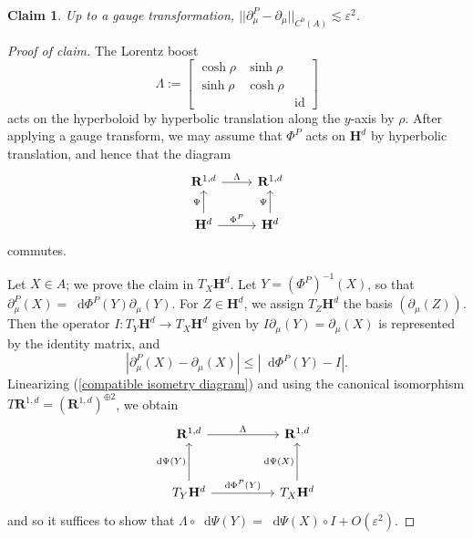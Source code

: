 \documentclass[reqno,10pt]{amsart}
\newcommand{\RR}{\mathbf{R}}
\newcommand{\Hyp}{\mathbf H}
\DeclareMathOperator{\id}{id}
\newcommand*\dif{\mathop{}\!\mathrm{d}}
\newtheorem{claim}{Claim}[theorem]
\theoremstyle{definition}
\numberwithin{equation}{section}
\begin{document}
\begin{claim}
Up to a gauge transformation, $||\partial^P_\mu - \partial_\mu||_{C^0(A)} \lesssim \varepsilon^2$.
\end{claim}
\begin{proof}[Proof of claim]
The Lorentz boost
$$\Lambda := \begin{bmatrix}\cosh \rho & \sinh \rho \\ \sinh \rho & \cosh \rho \\ &&\id\end{bmatrix}$$
acts on the hyperboloid by hyperbolic translation along the $y$-axis by $\rho$.
After applying a gauge transform, we may assume that $\Phi^P$ acts on $\Hyp^d$ by hyperbolic translation, and hence that the diagram
\begin{equation}\label{compatible isometry diagram}
\begin{tikzcd}
\RR^{1, d} \arrow[r, "\Lambda"] & \RR^{1, d} \\
\Hyp^d \arrow[u, "\Psi"] \arrow[r, "\Phi^P"] & \Hyp^d \arrow[u, "\Psi"]
\end{tikzcd}
\end{equation}
commutes. 

Let $X \in A$; we prove the claim in $T_X \Hyp^d$.
Let $Y = (\Phi^P)^{-1}(X)$, so that $\partial^P_\mu(X) = \dif \Phi^P(Y) \partial_\mu(Y)$.
For $Z \in \Hyp^d$, we assign $T_Z \Hyp^d$ the basis $(\partial_\mu(Z))$.
Then the operator $I: T_Y \Hyp^d \to T_X \Hyp^d$ given by $I \partial_\mu(Y) = \partial_\mu(X)$ is represented by the identity matrix, and
$$|\partial^P_\mu(X) - \partial_\mu(X)| \leq |\dif \Phi^P(Y) - I|.$$
Linearizing (\ref{compatible isometry diagram}) and using the canonical isomorphism $T\RR^{1, d} = (\RR^{1, d})^{\oplus 2}$, we obtain
$$\begin{tikzcd}[column sep=50pt, row sep=30pt]
\RR^{1, d} \arrow[r, "\Lambda"] & \RR^{1, d} \\
T_Y \Hyp^d \arrow[u, "\dif \Psi(Y)"] \arrow[r, "\dif \Phi^P(Y)"] & T_X \Hyp^d \arrow[u, "\dif \Psi(X)"]
\end{tikzcd}$$
and so it suffices to show that $\Lambda \circ \dif \Psi(Y) = \dif \Psi(X) \circ I + O(\varepsilon^2)$.


\end{proof}
\end{document}
